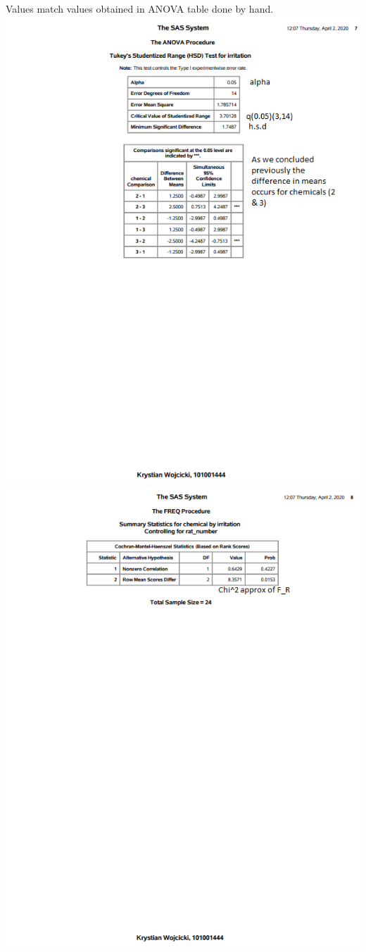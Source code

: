 \documentclass{article}
\begin{document}
\begin{center}
Values match values obtained in ANOVA table done by hand.
\includegraphics[scale=1]{a4_sas7}
\includegraphics[scale=1]{a4_sas8}
\end{center}
\end{document}
